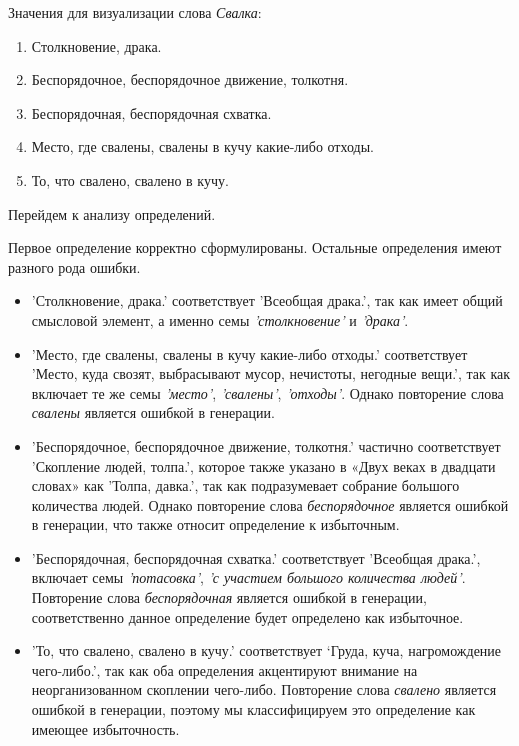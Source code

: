Значения для визуализации слова \textit{Свалка}:

\begin{enumerate}
    \item Столкновение, драка.
    \item Беспорядочное, беспорядочное движение, толкотня.
    \item Беспорядочная, беспорядочная схватка.
    \item Место, где свалены, свалены в кучу какие-либо отходы.
    \item То, что свалено, свалено в кучу.
\end{enumerate}

Перейдем к анализу определений.

Первое определение корректно сформулированы.
Остальные определения имеют разного рода ошибки.

\begin{itemize}
    \item ’Столкновение, драка.’ соответствует ’Всеобщая драка.’, так как
имеет общий смысловой элемент, а именно семы \textit{’столкновение’} и \textit{’драка’}.

    \item ’Место, где свалены, свалены в кучу какие-либо отходы.’ соответствует
’Место, куда свозят, выбрасывают мусор, нечистоты, негодные вещи.’,
так как включает те же семы \textit{’место’}, \textit{’свалены’}, \textit{’отходы’}.
Однако повторение слова \textit{свалены} является ошибкой в генерации.
\end{itemize}

\begin{itemize}
    \item ’Беспорядочное, беспорядочное движение, толкотня.’ частично соответствует
’Скопление людей, толпа.’, которое также указано в «Двух веках в двадцати словах» как ’Толпа, давка.’,
так как подразумевает собрание большого количества людей.
Однако повторение слова \textit{беспорядочное} является ошибкой в генерации,
что также относит определение к избыточным.

    \item ’Беспорядочная, беспорядочная схватка.’ соответствует
’Всеобщая драка.’, включает семы \textit{’потасовка’}, \textit{’с участием большого количества людей’}.
Повторение слова \textit{беспорядочная} является ошибкой в генерации,
соответственно данное определение будет определено как избыточное.

    \item ’То, что свалено, свалено в кучу.’ соответствует
‘Груда, куча, нагромождение чего-либо.’, так как оба определения акцентируют внимание
на неорганизованном скоплении чего-либо.
Повторение слова \textit{свалено} является ошибкой в генерации,
поэтому мы классифицируем это определение как имеющее избыточность.
\end{itemize}

